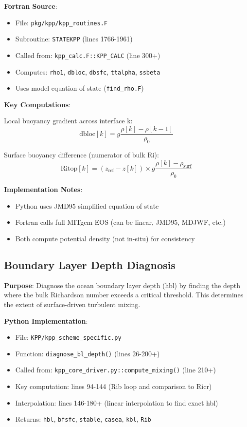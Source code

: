 \documentclass[11pt]{article}
\begin{document}
\textbf{Fortran Source}:
\begin{itemize}
    \item File: \verb|pkg/kpp/kpp_routines.F|
    \item Subroutine: \verb|STATEKPP| (lines 1766-1961)
    \item Called from: \verb|kpp_calc.F::KPP_CALC| (line 300+)
    \item Computes: \verb|rho1|, \verb|dbloc|, \verb|dbsfc|, \verb|ttalpha|, \verb|ssbeta|
    \item Uses model equation of state (\verb|find_rho.F|)
\end{itemize}

\textbf{Key Computations}:

Local buoyancy gradient across interface k:
\begin{equation}
\text{dbloc}[k] = g \frac{\rho[k] - \rho[k-1]}{\rho_0}
\end{equation}

Surface buoyancy difference (numerator of bulk Ri):
\begin{equation}
\text{Ritop}[k] = (z_{\text{ref}} - z[k]) \times g \frac{\rho[k] - \rho_{\text{surf}}}{\rho_0}
\end{equation}

\textbf{Implementation Notes}:
\begin{itemize}
    \item Python uses JMD95 simplified equation of state
    \item Fortran calls full MITgcm EOS (can be linear, JMD95, MDJWF, etc.)
    \item Both compute potential density (not in-situ) for consistency
\end{itemize}

\subsection{Boundary Layer Depth Diagnosis}

\textbf{Purpose}: Diagnose the ocean boundary layer depth (hbl) by finding the depth where the bulk Richardson number exceeds a critical threshold. This determines the extent of surface-driven turbulent mixing.

\textbf{Python Implementation}:
\begin{itemize}
    \item File: \verb|KPP/kpp_scheme_specific.py|
    \item Function: \verb|diagnose_bl_depth()| (lines 26-200+)
    \item Called from: \verb|kpp_core_driver.py::compute_mixing()| (line 210+)
    \item Key computation: lines 94-144 (Rib loop and comparison to Ricr)
    \item Interpolation: lines 146-180+ (linear interpolation to find exact hbl)
    \item Returns: \verb|hbl|, \verb|bfsfc|, \verb|stable|, \verb|casea|, \verb|kbl|, \verb|Rib|
\end{itemize}
\end{document}
